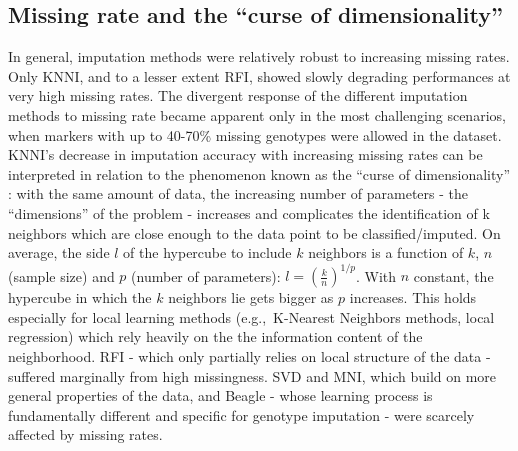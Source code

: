 \subsection{Missing rate and the ``curse of dimensionality''}
\label{sec:missing_rate_curse_dimensionality}
In general, imputation methods were relatively robust to increasing missing rates. Only KNNI, and to a lesser extent RFI, showed slowly degrading performances at very high missing rates. The divergent response of the different imputation methods to missing rate became apparent only in the most challenging scenarios, when markers with up to 40-70\% missing genotypes were allowed in the dataset.\\
KNNI's decrease in imputation accuracy with increasing missing rates can be interpreted in relation to the phenomenon known as the ``curse of dimensionality'' \cite{bellman_dynamic_1957,marimont_nearest_1979}: with the same amount of data, the increasing number of parameters - the ``dimensions'' of the problem - increases and complicates the identification of k neighbors which are close enough to the data point to be classified/imputed. 
On average, the side $l$ of the hypercube to include $k$ neighbors is a function of $k$, $n$ (sample size) and $p$ (number of parameters): $l = \left ( \frac{k}{n} \right )^{1/p}$. With $n$ constant, the hypercube in which the $k$ neighbors lie gets bigger as $p$ increases. This holds especially for local learning methods (e.g.,~K-Nearest Neighbors methods, local regression) which rely heavily on the the information content of the neighborhood. RFI - which only partially relies on local structure of the data - suffered marginally from high missingness. SVD and MNI, which build on more general properties of the data, and Beagle - whose learning process is fundamentally different and specific for genotype imputation - were scarcely affected by missing rates.

